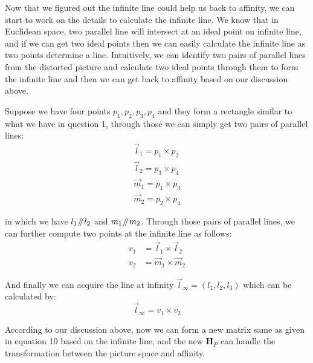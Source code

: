 \documentclass[conference]{IEEEtran}
\let\oldvec\vec
\renewcommand{\vec}[1]{\oldvec{\mathit{#1}}}
\newcommand{\mat}[1]{\mathbf{#1}} %
\newcommand{\parallelsum}{\mathbin{\!/\mkern-5mu/\!}}
\begin{document}
Now that we figured out the infinite line could help us back to affinity, we can start to work on the details to calculate the infinite line. We know that in Euclidean space, two parallel line will intersect at an ideal point on infinite line, and if we can get two ideal points then we can easily calculate the infinite line as two points determine a line. Intuitively, we can identify two pairs of parallel lines from the distorted picture and calculate two ideal points through them to form the infinite line and then we can get back to affinity based on our discussion above.

Suppose we have four points $p_1, p_2, p_3, p_4$ and they form a rectangle similar to what we have in question 1, through those we can simply get two pairs of parallel lines:
\begin{equation}
\begin{split}
	\vec{l}_1 = p_1 \times p_2\\
	\vec{l}_2 = p_3 \times p_4\\
	\vec{m}_1 = p_1 \times p_3\\
	\vec{m}_2 = p_2 \times p_4
\end{split}
\end{equation}

\noindent in which we have $l_1\parallelsum l_2$ and $m_1\parallelsum m_2$. Through those pairs of parallel lines, we can further compute two points at the infinite line as follows:
\begin{equation}
\begin{split}
	v_1 &= \vec{l}_1\times \vec{l}_2\\
	v_2 &= \vec{m}_1 \times \vec{m}_2
\end{split}
\end{equation}

\noindent And finally we can acquire the line at infinity $\vec{l}_{\infty} = (l_1, l_2, l_3)$ which can be calculated by:
\begin{equation}
	\vec{l}_{\infty} = v_1 \times v_2
\end{equation}

\noindent According to our discussion above, now we can form a new matrix same as given in equation 10 based on the infinite line, and the new $\mat{H}_P$ can handle the transformation between the picture space and affinity.



\end{document}

